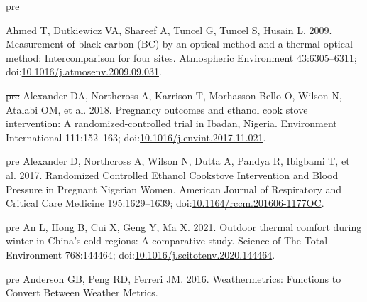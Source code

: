 \documentclass[
  letterpaper,
  DIV=11,
  numbers=noendperiod]{scrartcl}
\newlength{\cslhangindent}
\newenvironment{CSLReferences}[2] %
 {\begin{list}{}{%
  \setlength{\itemindent}{0pt} %
  \setlength{\leftmargin}{0pt} %
  \setlength{\parsep}{0pt} %
  \ifodd #1
   \setlength{\leftmargin}{\cslhangindent} %
   \setlength{\itemindent}{-1\cslhangindent} %
  \fi
  \setlength{\itemsep}{#2\baselineskip}}} %
 {\end{list}} %
\providecommand{\DIFdel}[1]{{\protect\color{red}\sout{#1}}}                      %
\providecommand{\DIFaddbegin}{} %
\providecommand{\DIFaddend}{} %
\providecommand{\DIFdelbegin}{} %
\providecommand{\DIFdelend}{} %
\newcommand{\DIFscaledelfig}{0.5}
\newlength{\DIFdelgraphicswidth} %
\newlength{\DIFdelgraphicsheight} %
\newcommand{\DIFaddincludegraphics}[2][]{{\color{blue}\fbox{\DIFOincludegraphics[#1]{#2}}}} %
\newcommand{\DIFdelincludegraphics}[2][]{%
\sbox{\DIFdelgraphicsbox}{\DIFOincludegraphics[#1]{#2}}%
\settoboxwidth{\DIFdelgraphicswidth}{\DIFdelgraphicsbox} %
\settoboxtotalheight{\DIFdelgraphicsheight}{\DIFdelgraphicsbox} %
\scalebox{\DIFscaledelfig}{%
\parbox[b]{\DIFdelgraphicswidth}{\usebox{\DIFdelgraphicsbox}\\[-\baselineskip] \rule{\DIFdelgraphicswidth}{0em}}\llap{\resizebox{\DIFdelgraphicswidth}{\DIFdelgraphicsheight}{%
\setlength{\unitlength}{\DIFdelgraphicswidth}%
\begin{picture}(1,1)%
\thicklines\linethickness{2pt} %
{\color[rgb]{1,0,0}\put(0,0){\framebox(1,1){}}}%
{\color[rgb]{1,0,0}\put(0,0){\line( 1,1){1}}}%
{\color[rgb]{1,0,0}\put(0,1){\line(1,-1){1}}}%
\end{picture}%
}\hspace*{3pt}}} %
} %
\DeclareRobustCommand{\DIFaddbegin}{\DIFOaddbegin \let\includegraphics\DIFaddincludegraphics} %
\DeclareRobustCommand{\DIFaddend}{\DIFOaddend \let\includegraphics\DIFOincludegraphics} %
\DeclareRobustCommand{\DIFdelbegin}{\DIFOdelbegin \let\includegraphics\DIFdelincludegraphics} %
\DeclareRobustCommand{\DIFdelend}{\DIFOaddend \let\includegraphics\DIFOincludegraphics} %
\begin{document}
\DIFdelbegin %
\DIFdel{pre}%
\DIFdelend \DIFaddbegin {}\label{refs}
\begin{CSLReferences}{1}{1}
\DIFaddend Ahmed T, Dutkiewicz VA, Shareef A, Tuncel G, Tuncel S, Husain L. 2009.
Measurement of black carbon ({BC}) by an optical method and a
thermal-optical method: {Intercomparison} for four sites. Atmospheric
Environment 43:6305--6311;
doi:\href{https://doi.org/10.1016/j.atmosenv.2009.09.031}{10.1016/j.atmosenv.2009.09.031}.

\DIFdelbegin %
\DIFdel{pre}%
\DIFdelend \DIFaddbegin {}
\DIFaddend Alexander DA, Northcross A, Karrison T, Morhasson-Bello O, Wilson N,
Atalabi OM, et al. 2018. Pregnancy outcomes and ethanol cook stove
intervention: {A} randomized-controlled trial in {Ibadan}, {Nigeria}.
Environment International 111:152--163;
doi:\href{https://doi.org/10.1016/j.envint.2017.11.021}{10.1016/j.envint.2017.11.021}.

\DIFdelbegin %
\DIFdel{pre}%
\DIFdelend \DIFaddbegin {}
\DIFaddend Alexander D, Northcross A, Wilson N, Dutta A, Pandya R, Ibigbami T, et
al. 2017. Randomized {Controlled Ethanol Cookstove Intervention} and
{Blood Pressure} in {Pregnant Nigerian Women}. American Journal of
Respiratory and Critical Care Medicine 195:1629--1639;
doi:\href{https://doi.org/10.1164/rccm.201606-1177OC}{10.1164/rccm.201606-1177OC}.

\DIFdelbegin %
\DIFdel{pre}%
\DIFdelend \DIFaddbegin {}
\DIFaddend An L, Hong B, Cui X, Geng Y, Ma X. 2021. Outdoor thermal comfort during
winter in {China}'s cold regions: {A} comparative study. Science of The
Total Environment 768:144464;
doi:\href{https://doi.org/10.1016/j.scitotenv.2020.144464}{10.1016/j.scitotenv.2020.144464}.

\DIFdelbegin %
\DIFdel{pre}%
\DIFdelend \DIFaddbegin {}
\DIFaddend Anderson GB, Peng RD, Ferreri JM. 2016. Weathermetrics: {Functions} to
{Convert Between Weather Metrics}.


\end{CSLReferences}
\end{document}
